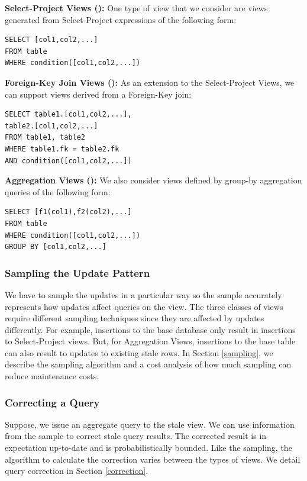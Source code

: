 \noindent\textbf{Select-Project Views (\spview): } One type of view that we consider are views generated from Select-Project
expressions of the following form:

\begin{lstlisting}
SELECT [col1,col2,...] 
FROM table 
WHERE condition([col1,col2,...]) 
\end{lstlisting}

\vspace{1em}

\noindent\textbf{Foreign-Key Join Views (\fjview): } As an extension to the Select-Project Views, we can support views derived from a Foreign-Key join:

\begin{lstlisting}
SELECT table1.[col1,col2,...], 
table2.[col1,col2,...]
FROM table1, table2 
WHERE table1.fk = table2.fk 
AND condition([col1,col2,...]) 
\end{lstlisting}

\vspace{1em}

\noindent\textbf{Aggregation Views (\aggview): } We also consider views defined by group-by aggregation queries of the following form:

\begin{lstlisting}
SELECT [f1(col1),f2(col2),...] 
FROM table 
WHERE condition([col1,col2,...]) 
GROUP BY [col1,col2,...]
\end{lstlisting}

\subsubsection{Sampling the Update Pattern}
We have to sample the updates in a particular way so the sample accurately represents how updates
affect queries on the view. 
The three classes of views require different sampling techniques since they are affected by updates differently.
For example, insertions to the base database only result in insertions to Select-Project views.
But, for Aggregation Views, insertions to the base table can also result to updates to existing stale rows.
In Section \ref{sampling}, we describe the sampling algorithm and a cost analysis of how much sampling can reduce maintenance costs.

\subsubsection{Correcting a Query}
Suppose, we issue an aggregate query to the stale view.
We can use information from the sample to correct stale query results.
The corrected result is in expectation up-to-date and is probabilistically bounded.
Like the sampling, the algorithm to calculate the correction varies between the types of views.
We detail query correction in Section \ref{correction}.

